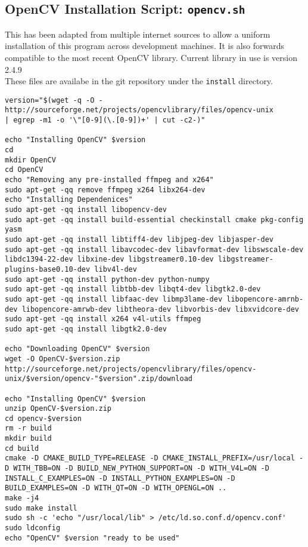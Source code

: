 \documentclass[main.tex]{subfiles}
\begin{document}
\subsection{OpenCV Installation Script: \texttt{\textbf{opencv.sh}}}
This has been adapted from multiple internet sources to allow a uniform installation of this program across development machines. It is also forwards compatible to the most recent OpenCV library. Current library in use is version 2.4.9\\
These files are availabe in the git repository under the \texttt{install} directory. 
\begin{lstlisting}
version="$(wget -q -O - http://sourceforge.net/projects/opencvlibrary/files/opencv-unix 
| egrep -m1 -o '\"[0-9](\.[0-9])+' | cut -c2-)"

echo "Installing OpenCV" $version
cd
mkdir OpenCV
cd OpenCV
echo "Removing any pre-installed ffmpeg and x264"
sudo apt-get -qq remove ffmpeg x264 libx264-dev
echo "Installing Dependenices"
sudo apt-get -qq install libopencv-dev 
sudo apt-get -qq install build-essential checkinstall cmake pkg-config yasm 
sudo apt-get -qq install libtiff4-dev libjpeg-dev libjasper-dev 
sudo apt-get -qq install libavcodec-dev libavformat-dev libswscale-dev libdc1394-22-dev libxine-dev libgstreamer0.10-dev libgstreamer-plugins-base0.10-dev libv4l-dev 
sudo apt-get -qq install python-dev python-numpy 
sudo apt-get -qq install libtbb-dev libqt4-dev libgtk2.0-dev 
sudo apt-get -qq install libfaac-dev libmp3lame-dev libopencore-amrnb-dev libopencore-amrwb-dev libtheora-dev libvorbis-dev libxvidcore-dev 
sudo apt-get -qq install x264 v4l-utils ffmpeg
sudo apt-get -qq install libgtk2.0-dev

echo "Downloading OpenCV" $version
wget -O OpenCV-$version.zip http://sourceforge.net/projects/opencvlibrary/files/opencv-unix/$version/opencv-"$version".zip/download

echo "Installing OpenCV" $version
unzip OpenCV-$version.zip
cd opencv-$version
rm -r build
mkdir build
cd build
cmake -D CMAKE_BUILD_TYPE=RELEASE -D CMAKE_INSTALL_PREFIX=/usr/local -D WITH_TBB=ON -D BUILD_NEW_PYTHON_SUPPORT=ON -D WITH_V4L=ON -D INSTALL_C_EXAMPLES=ON -D INSTALL_PYTHON_EXAMPLES=ON -D BUILD_EXAMPLES=ON -D WITH_QT=ON -D WITH_OPENGL=ON ..
make -j4
sudo make install
sudo sh -c 'echo "/usr/local/lib" > /etc/ld.so.conf.d/opencv.conf'
sudo ldconfig
echo "OpenCV" $version "ready to be used"

\end{lstlisting}
\end{document}
